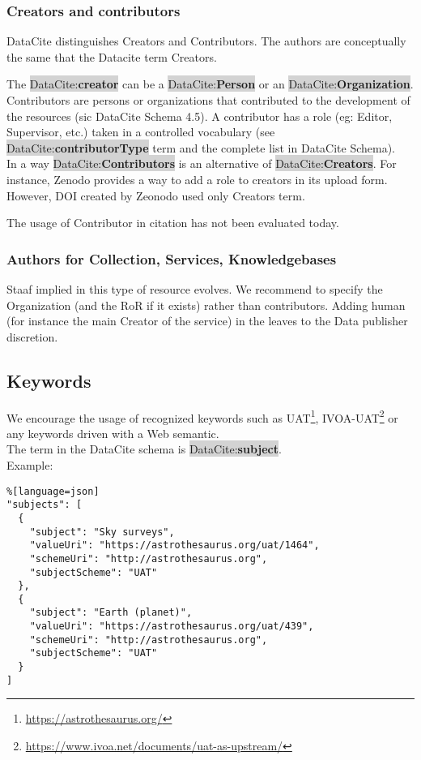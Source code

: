 \documentclass[11pt,a4paper]{ivoa}
\newcommand{\dataciteterm}[1]{\colorbox{lightgray}{DataCite:\textbf{#1}}}
\begin{document}
\subsubsection{Creators and contributors}
DataCite distinguishes Creators and Contributors. The authors are conceptually the same that the Datacite term Creators.

The \dataciteterm{creator} can be a \dataciteterm{Person} or an \dataciteterm{Organization}.
Contributors are persons or organizations that contributed to the development of the resources (sic DataCite Schema 4.5).
A contributor has a role (eg: Editor, Supervisor, etc.) taken in a controlled vocabulary (see \dataciteterm{contributorType} term and the complete list in DataCite Schema).\\

In a way \dataciteterm{Contributors} is an alternative of \dataciteterm{Creators}. For instance, Zenodo provides a way to add a role to creators in its upload form. However, DOI created by Zeonodo used only Creators term.

The usage of Contributor in citation has not been evaluated today.


\subsubsection{Authors for Collection, Services, Knowledgebases}
Staaf implied in this type of resource evolves. We recommend to specify the Organization (and the RoR if it exists) rather than contributors. Adding human (for instance the main Creator of the service) in the leaves to the Data publisher discretion.

\subsection{Keywords}
\label{sec:keywords}
We encourage the usage of recognized keywords such as UAT\footnote{\url{https://astrothesaurus.org/}}, IVOA-UAT\footnote{\url{https://www.ivoa.net/documents/uat-as-upstream/}} or any keywords driven with a Web semantic.\\

The term in the DataCite schema is \dataciteterm{subject}.\\

Example:\\
\begin{lstlisting}%[language=json]
"subjects": [
  {
    "subject": "Sky surveys",
    "valueUri": "https://astrothesaurus.org/uat/1464",
    "schemeUri": "http://astrothesaurus.org",
    "subjectScheme": "UAT"
  },
  {
    "subject": "Earth (planet)",
    "valueUri": "https://astrothesaurus.org/uat/439",
    "schemeUri": "http://astrothesaurus.org",
    "subjectScheme": "UAT"
  }
]

\end{lstlisting}
\end{document}
